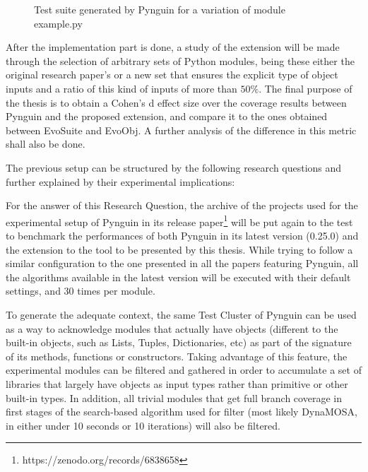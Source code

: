 \documentclass[%
  chapterprefix=false,%
  open=right,%
  twoside=true,%
  paper=a4,%
  logofile={Figures/logo.png},%
  thesistype=master,%
  UKenglish,%
]{se2thesis}
\begin{document}
\begin{figure}
  \inputminted[linenos]{python}{Figures/test2.py}
  \caption{Test suite generated by Pynguin for a variation of module example.py\label{lst:5}}
\end{figure}

After the implementation part is done, a study of the extension will be made through the selection of arbitrary sets of Python modules, being these either the original research paper's or a new set that ensures the explicit type of object inputs and a ratio of this kind of inputs of more than $50\%$.
The final purpose of the thesis is to obtain a Cohen's d effect size over the coverage results between Pynguin and the proposed extension, and compare it to the ones obtained between EvoSuite and EvoObj.
A further analysis of the difference in this metric shall also be done.

The previous setup can be structured by the following research questions and further explained by their experimental implications:


For the answer of this Research Question, the archive of the projects used for the experimental setup of Pynguin in its release paper\footnote{https://zenodo.org/records/6838658} will be put again to the test to benchmark the performances of both Pynguin in its latest version (0.25.0) and the extension to the tool to be presented by this thesis.
While trying to follow a similar configuration to the one presented in all the papers featuring Pynguin, all the algorithms available in the latest version will be executed with their default settings, and 30 times per module.


To generate the adequate context, the same Test Cluster of Pynguin can be used as a way to acknowledge modules that actually have objects (different to the built-in objects, such as Lists, Tuples, Dictionaries, etc) as part of the signature of its methods, functions or constructors.
Taking advantage of this feature, the experimental modules can be filtered and gathered in order to accumulate a set of libraries that largely have objects as input types rather than primitive or other built-in types.
In addition, all trivial modules that get full branch coverage in first stages of the search-based algorithm used for filter (most likely DynaMOSA, in either under 10 seconds or 10 iterations) will also be filtered. 
\end{document}

